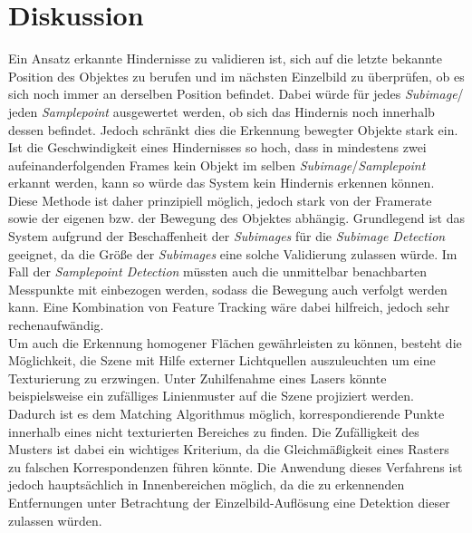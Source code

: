 \section{Diskussion}
\label{sec:conflict_discussion}
Ein Ansatz erkannte Hindernisse zu validieren ist, sich auf die letzte bekannte Position des Objektes zu berufen und im nächsten Einzelbild zu überprüfen, ob es sich noch immer an derselben Position befindet. Dabei würde für jedes \emph{Subimage}/ jeden \emph{Samplepoint} ausgewertet werden, ob sich das Hindernis noch innerhalb dessen befindet. Jedoch schränkt dies die Erkennung bewegter Objekte stark ein. Ist die Geschwindigkeit eines Hindernisses so hoch, dass in mindestens zwei aufeinanderfolgenden Frames kein Objekt im selben \emph{Subimage}/\emph{Samplepoint} erkannt werden, kann so würde das System kein Hindernis erkennen können. Diese Methode ist daher prinzipiell möglich, jedoch stark von der Framerate sowie der eigenen bzw. der Bewegung des Objektes abhängig. Grundlegend ist das System aufgrund der Beschaffenheit der \emph{Subimages} für die \emph{Subimage Detection} geeignet, da die Größe der \emph{Subimages} eine solche Validierung zulassen würde. Im Fall der \emph{Samplepoint Detection} müssten auch die unmittelbar benachbarten Messpunkte mit einbezogen werden, sodass die Bewegung auch verfolgt werden kann. Eine Kombination von Feature Tracking wäre dabei hilfreich, jedoch sehr rechenaufwändig.\\

\noindent
Um auch die Erkennung homogener Flächen gewährleisten zu können, besteht die Möglichkeit, die Szene mit Hilfe externer Lichtquellen auszuleuchten um eine Texturierung zu erzwingen. Unter Zuhilfenahme eines Lasers könnte beispielsweise ein zufälliges Linienmuster auf die Szene projiziert werden. Dadurch ist es dem Matching Algorithmus möglich, korrespondierende Punkte innerhalb eines nicht texturierten Bereiches zu finden. Die Zufälligkeit des Musters ist dabei ein wichtiges Kriterium, da die Gleichmäßigkeit eines Rasters zu falschen Korrespondenzen führen könnte. Die Anwendung dieses Verfahrens ist jedoch hauptsächlich in Innenbereichen möglich, da die zu erkennenden Entfernungen unter Betrachtung der Einzelbild-Auflösung eine Detektion dieser zulassen würden.\\

